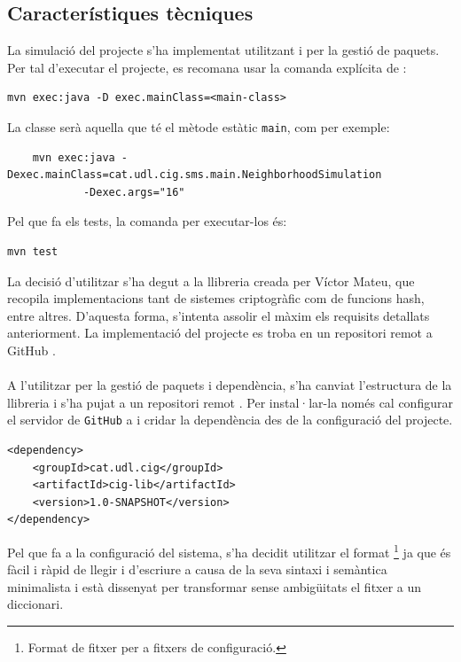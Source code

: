 \subsection{Característiques tècniques}
La simulació del projecte s'ha implementat utilitzant \texttt{\java} i \texttt{\mavenLarge} per la gestió de paquets. Per tal d'executar el projecte, es recomana usar la comanda explícita de \maven:
\begin{verbatim}
mvn exec:java -D exec.mainClass=<main-class>
\end{verbatim}
La classe serà aquella que té el mètode estàtic \texttt{main}, com per exemple:
\begin{verbatim}
	mvn exec:java -Dexec.mainClass=cat.udl.cig.sms.main.NeighborhoodSimulation 
	        -Dexec.args="16"
\end{verbatim}
Pel que fa els tests, la comanda per executar-los és:
\begin{verbatim}
mvn test
\end{verbatim}
La decisió d'utilitzar \texttt{\java} s'ha degut a la llibreria \ciglib creada per Víctor Mateu, que recopila implementacions tant de sistemes criptogràfic com de funcions hash, entre altres. D'aquesta forma, s'intenta assolir el màxim els requisits detallats anteriorment. La implementació del projecte es troba en un repositori remot a GitHub \cite{smart}.
\\
\\
A l'utilitzar \maven per la gestió de paquets i dependència, s'ha canviat l'estructura de la llibreria i s'ha pujat a un repositori remot \cite{ciglib}. Per instal·lar-la només cal configurar el servidor de \texttt{GitHub} a \maven i cridar la dependència des de la configuració del projecte.
\lstset{language=xml}
\begin{lstlisting}
<dependency>
	<groupId>cat.udl.cig</groupId>
	<artifactId>cig-lib</artifactId>
	<version>1.0-SNAPSHOT</version>
</dependency>
\end{lstlisting}
Pel que fa a la configuració del sistema, s'ha decidit utilitzar el format \toml\footnote{Format de fitxer per a fitxers de configuració.} ja que és fàcil i ràpid de llegir i d'escriure a causa de la seva sintaxi i semàntica minimalista i està dissenyat per transformar sense ambigüitats el fitxer a un diccionari.

